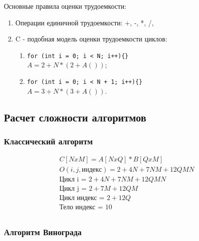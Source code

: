 \documentclass[a4paper, 14pt]{article}
\begin{document}
	Основные правила оценки трудоемкости:
	\begin{enumerate}
		\item Операции единичной трудоемкости: +, -, *, /, %
		\item C - подобная модель оценки трудоемкости циклов:
			\begin{enumerate}
				\item 
					\lstinline|for (int i = 0; i < N; i++){}| \\
					$ A = 2 + N * (2 + A()) $;
				\item
					\lstinline|for (int i = 0; i < N + 1; i++){}| \\
					$ A = 3 + N * (3 + A()) $.
				
			\end{enumerate}
	\end{enumerate}
	
	
	\subsection{Расчет сложности алгоритмов}
	
	\subsubsection{Классический алгоритм}	
	\begin{equation}
	\boxed{\begin{aligned}
		C[NxM] = A[NxQ] * B[QxM] \\
		O(i, j, индекс) = 2 + 4N + 7NM + 12QMN \\ 
		\text{Цикл i = } 2 + 4N + 7NM + 12QMN \\
		\text{Цикл j = } 2 + 7M + 12QM \\ 
		\text{Цикл индекс = } 2 + 12Q \\ 
		\text{Тело индекс = } 10 \\	
		\end{aligned}}
	\end{equation}
	
	\subsubsection{Алгоритм Винограда}
	
\end{document}

